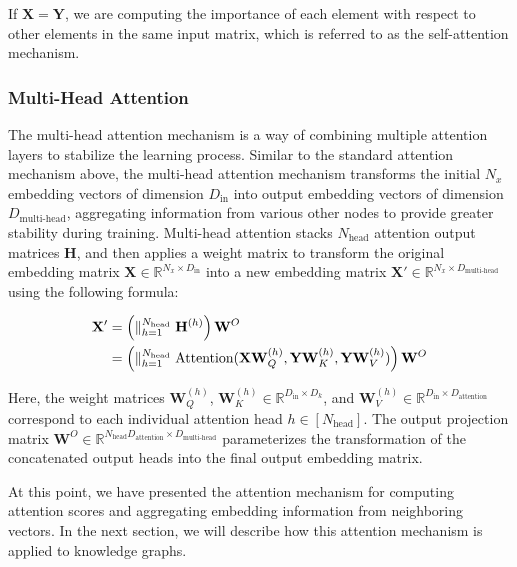 If $\mathbf{X} = \mathbf{Y}$, we are computing the importance of each element with respect to other elements in the same input matrix, which is referred to as the self-attention mechanism.


\subsubsection{Multi-Head Attention}

The multi-head attention mechanism is a way of combining multiple attention layers to stabilize the learning process. Similar to the standard attention mechanism above, the multi-head attention mechanism transforms the initial $N_x$ embedding vectors of dimension $D_{\text{in}}$ into output embedding vectors of dimension $D_{\text{multi-head}}$, aggregating information from various other nodes to provide greater stability during training. Multi-head attention stacks $N_{\text{head}}$ attention output matrices $\mathbf{H}$, and then applies a weight matrix to transform the original embedding matrix $\mathbf{X} \in \mathbb{R}^{N_x \times D_\text{in}}$ into a new embedding matrix $\mathbf{X}' \in \mathbb{R}^{N_x \times D_{\text{multi-head}}}$ using the following formula:

\begin{equation}
	\label{headAttention}
	\begin{split}
		\mathbf{X}'& =\left(\bigparallel_{h=1}^{N_{\text{head}}}\mathbf{H}^{(h)}\right)\mathbf{W}^{O} \\
		& = \left(\bigparallel_{h=1}^{N_{\text{head}}} \text{Attention}(\mathbf{X} \mathbf{W}_Q^{(h)}, \mathbf{Y} \mathbf{W}_K^{(h)}, \mathbf{Y} \mathbf{W}_V^{(h)}) \right)\mathbf{W}^{O}
	\end{split}
\end{equation}

Here, the weight matrices $\mathbf{W}_Q^{(h)}$, $\mathbf{W}_K^{(h)} \in \mathbb{R}^{D_{\text{in}} \times D_{k}}$, and $\mathbf{W}_V^{(h)} \in \mathbb{R}^{D_{\text{in}} \times D_{\text{attention}}}$ correspond to each individual attention head $h \in [N_{\text{head}}]$. The output projection matrix $\mathbf{W}^{O} \in \mathbb{R}^{N_{\text{head}} D_{\text{attention}} \times D_{\text{multi-head}}}$ parameterizes the transformation of the concatenated output heads into the final output embedding matrix.

At this point, we have presented the attention mechanism for computing attention scores and aggregating embedding information from neighboring vectors. In the next section, we will describe how this attention mechanism is applied to knowledge graphs.

